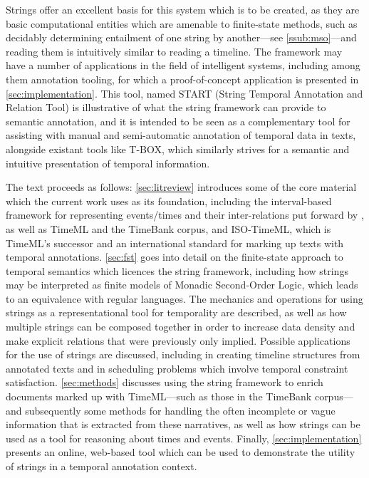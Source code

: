 \documentclass[a4paper,12pt,leqno]{article}
\begin{document}
Strings offer an excellent basis for this system which is to be created, as they are basic computational entities which are amenable to finite-state methods, such as decidably determining entailment of one string by another---see \cref{ssub:mso}---and reading them is intuitively similar to reading a timeline. The framework may have a number of applications in the field of intelligent systems, including among them annotation tooling, for which a proof-of-concept application is presented in \cref{sec:implementation}. This tool, named START (String Temporal Annotation and Relation Tool) is illustrative of what the string framework can provide to semantic annotation, and it is intended to be seen as a complementary tool for assisting with manual and semi-automatic annotation of temporal data in texts, alongside existant tools like T-BOX, which similarly strives for a semantic and intuitive presentation of temporal information.

The text proceeds as follows: \cref{sec:litreview} introduces some of the core material which the current work uses as its foundation, including the interval-based framework for representing events/times and their inter-relations put forward by \citet{allen1983maintaining}, as well as TimeML and the TimeBank corpus, and ISO-TimeML, which is TimeML's successor and an international standard for marking up texts with temporal annotations. \cref{sec:fst} goes into detail on the finite-state approach to temporal semantics which licences the string framework, including how strings may be interpreted as finite models of Monadic Second-Order Logic, which leads to an equivalence with regular languages. The mechanics and operations for using strings as a representational tool for temporality are described, as well as how multiple strings can be composed together in order to increase data density and make explicit relations that were previously only implied. Possible applications for the use of strings are discussed, including in creating timeline structures from annotated texts and in scheduling problems which involve temporal constraint satisfaction. \cref{sec:methods} discusses using the string framework to enrich documents marked up with TimeML---such as those in the TimeBank corpus---and subsequently some methods for handling the often incomplete or vague information that is extracted from these narratives, as well as how strings can be used as a tool for reasoning about times and events. Finally, \cref{sec:implementation} presents an online, web-based tool which can be used to demonstrate the utility of strings in a temporal annotation context.%
\newpage
\end{document}
